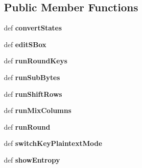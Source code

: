 \subsection*{Public Member Functions}
\begin{DoxyCompactItemize}
\item 
\hypertarget{classsimplegui2_1_1_main_scene_a512bd8ab19046ed7a2fd655bc5bd025d}{def {\bfseries convert\-States}}\label{classsimplegui2_1_1_main_scene_a512bd8ab19046ed7a2fd655bc5bd025d}

\item 
\hypertarget{classsimplegui2_1_1_main_scene_ab8ba40320257851c4bb70a20c523269c}{def {\bfseries edit\-S\-Box}}\label{classsimplegui2_1_1_main_scene_ab8ba40320257851c4bb70a20c523269c}

\item 
\hypertarget{classsimplegui2_1_1_main_scene_a9e6debd72f75e89001ddab14eb52ed0f}{def {\bfseries run\-Round\-Keys}}\label{classsimplegui2_1_1_main_scene_a9e6debd72f75e89001ddab14eb52ed0f}

\item 
\hypertarget{classsimplegui2_1_1_main_scene_aa3fee479905df6d8522e89f31ffe8b5d}{def {\bfseries run\-Sub\-Bytes}}\label{classsimplegui2_1_1_main_scene_aa3fee479905df6d8522e89f31ffe8b5d}

\item 
\hypertarget{classsimplegui2_1_1_main_scene_a40656a24001ca03ac64df1228eb4581c}{def {\bfseries run\-Shift\-Rows}}\label{classsimplegui2_1_1_main_scene_a40656a24001ca03ac64df1228eb4581c}

\item 
\hypertarget{classsimplegui2_1_1_main_scene_ae49a81069e085a2dcf463b71119d5f2a}{def {\bfseries run\-Mix\-Columns}}\label{classsimplegui2_1_1_main_scene_ae49a81069e085a2dcf463b71119d5f2a}

\item 
\hypertarget{classsimplegui2_1_1_main_scene_a223abaad412e5f2c14808fd743344979}{def {\bfseries run\-Round}}\label{classsimplegui2_1_1_main_scene_a223abaad412e5f2c14808fd743344979}

\item 
\hypertarget{classsimplegui2_1_1_main_scene_a9250b1d513c66c5e7f1b7fe9c9452319}{def {\bfseries switch\-Key\-Plaintext\-Mode}}\label{classsimplegui2_1_1_main_scene_a9250b1d513c66c5e7f1b7fe9c9452319}

\item 
\hypertarget{classsimplegui2_1_1_main_scene_a62cb7fad67dbd5850ca9c922946458b2}{def {\bfseries show\-Entropy}}\label{classsimplegui2_1_1_main_scene_a62cb7fad67dbd5850ca9c922946458b2}


\end{DoxyCompactItemize}
